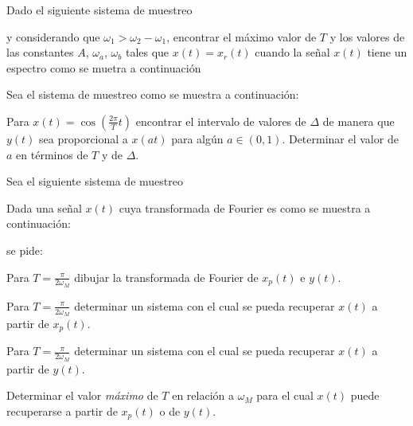 \begin{ejercicio}
    Dado el siguiente sistema de muestreo
    \begin{center}
    
    \end{center}
    y considerando que $\omega_1 > \omega_2-\omega_1$, encontrar el máximo valor de $T$ y los valores de las constantes $A$, $\omega_a$, $\omega_b$ tales que $x(t)=x_r(t)$ cuando la señal $x(t)$ tiene un espectro como se muetra a continuación
    \begin{center}
    
    \end{center}
\end{ejercicio}
    
\begin{ejercicio}
    Sea el sistema de muestreo como se muestra a continuación:
    \begin{center}
    
    \end{center}
    Para $x(t)=\cos\left(\frac{2\pi}{T}t\right)$ encontrar el intervalo de valores de $\Delta$ de manera que $y(t)$ sea proporcional a $x(at)$ para algún $a\in(0,1)$. Determinar el valor de $a$ en términos de $T$ y de $\Delta$.
\end{ejercicio}
    
\begin{ejercicio}
    Sea el siguiente sistema de muestreo
    \begin{center}
    
    \end{center}
    Dada una señal $x(t)$ cuya transformada de Fourier es como se muestra a continuación:
    \begin{center}
    
    \end{center}
    se pide:
    
    \inciso Para $T=\frac{\pi}{2\omega_M}$ dibujar la transformada de Fourier de $x_p(t)$ e $y(t)$.
    
    \inciso Para $T=\frac{\pi}{2\omega_M}$ determinar un sistema con el cual se pueda recuperar $x(t)$ a partir de $x_p(t)$.
    
    \inciso Para $T=\frac{\pi}{2\omega_M}$ determinar un sistema con el cual se pueda recuperar $x(t)$ a partir de $y(t)$.
    
    \inciso Determinar el valor \emph{máximo} de $T$ en relación a $\omega_M$ para el cual $x(t)$ puede recuperarse a partir de $x_p(t)$ o de $y(t)$.
    
\end{ejercicio}
    
